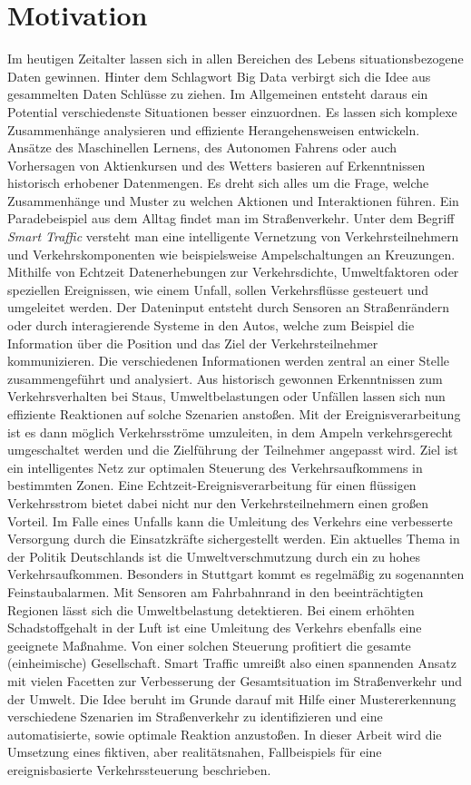 \section{Motivation}

Im heutigen Zeitalter lassen sich in allen Bereichen des Lebens situationsbezogene Daten gewinnen. Hinter dem Schlagwort Big Data verbirgt sich die Idee aus gesammelten Daten Schlüsse zu ziehen. Im Allgemeinen entsteht daraus ein Potential verschiedenste Situationen  besser einzuordnen. Es lassen sich komplexe Zusammenhänge analysieren und effiziente Herangehensweisen entwickeln.  Ansätze des Maschinellen Lernens, des Autonomen Fahrens oder auch Vorhersagen von Aktienkursen und des Wetters basieren auf Erkenntnissen historisch erhobener Datenmengen. Es dreht sich alles um die Frage, welche Zusammenhänge und Muster zu welchen Aktionen und Interaktionen führen.
Ein Paradebeispiel aus dem Alltag findet man im Straßenverkehr. Unter dem Begriff \emph{Smart Traffic} versteht man eine intelligente Vernetzung von Verkehrsteilnehmern und Verkehrskomponenten wie beispielsweise Ampelschaltungen an Kreuzungen. Mithilfe von Echtzeit Datenerhebungen zur Verkehrsdichte, Umweltfaktoren oder speziellen Ereignissen, wie einem Unfall, sollen Verkehrsflüsse gesteuert und umgeleitet werden. Der Dateninput entsteht durch Sensoren an Straßenrändern oder durch interagierende Systeme in den Autos, welche zum Beispiel die Information über die Position und das Ziel der Verkehrsteilnehmer kommunizieren. Die verschiedenen Informationen werden zentral an einer Stelle zusammengeführt und analysiert. Aus historisch gewonnen Erkenntnissen zum Verkehrsverhalten bei Staus, Umweltbelastungen oder Unfällen lassen sich nun effiziente Reaktionen auf solche Szenarien anstoßen.  Mit der Ereignisverarbeitung ist  es dann möglich Verkehrsströme umzuleiten, in dem Ampeln verkehrsgerecht umgeschaltet werden und die Zielführung der Teilnehmer angepasst wird. Ziel ist ein intelligentes Netz zur optimalen Steuerung des Verkehrsaufkommens in bestimmten Zonen. Eine Echtzeit-Ereignisverarbeitung für einen flüssigen Verkehrsstrom bietet dabei nicht nur den Verkehrsteilnehmern einen großen Vorteil. Im Falle eines Unfalls kann die Umleitung des Verkehrs eine verbesserte Versorgung durch die Einsatzkräfte sichergestellt werden. Ein aktuelles Thema in der Politik Deutschlands ist die Umweltverschmutzung durch ein zu hohes Verkehrsaufkommen. Besonders in Stuttgart kommt es regelmäßig zu sogenannten Feinstaubalarmen. Mit Sensoren am Fahrbahnrand in den beeinträchtigten Regionen lässt sich die Umweltbelastung detektieren. Bei einem erhöhten Schadstoffgehalt in der Luft ist eine Umleitung des Verkehrs ebenfalls eine geeignete Maßnahme. Von einer solchen Steuerung profitiert die gesamte (einheimische) Gesellschaft. 
Smart Traffic umreißt also einen spannenden Ansatz mit vielen Facetten zur Verbesserung der Gesamtsituation im Straßenverkehr und der Umwelt. Die Idee beruht im Grunde darauf mit Hilfe einer Mustererkennung verschiedene Szenarien im Straßenverkehr zu identifizieren und eine automatisierte, sowie optimale Reaktion anzustoßen. In dieser Arbeit wird die Umsetzung eines fiktiven, aber realitätsnahen, Fallbeispiels für eine ereignisbasierte Verkehrssteuerung beschrieben. 


\clearpage

